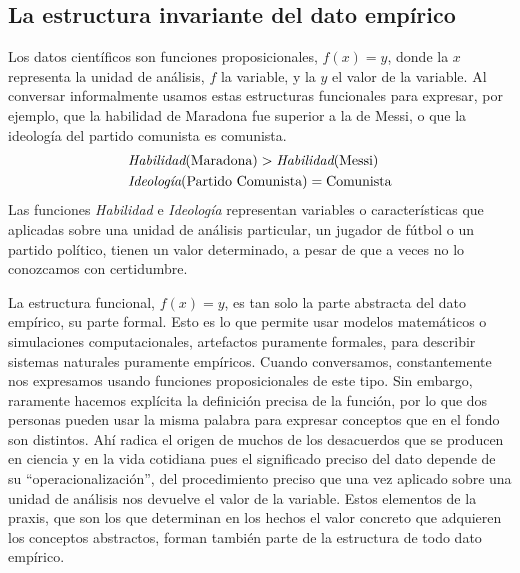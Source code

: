 \documentclass[a4paper,11pt]{book}
\theoremstyle{definition}
\begin{document}



\subsection{La estructura invariante del dato emp\'irico} \label{sec:estructura_invariante}

Los datos cient\'ificos son funciones proposicionales, $f(x)=y$, donde la $x$ representa la unidad de an\'alisis, $f$ la variable, y la $y$ el valor de la variable.
%
%
Al conversar informalmente usamos estas estructuras funcionales para expresar, por ejemplo, que la habilidad de Maradona fue superior a la de Messi, o que la ideolog\'ia del partido comunista es comunista.
%
\begin{align*}\label{eq:opiniones}
& \emph{Habilidad}(\text{Maradona}) > \emph{Habilidad}(\text{Messi}) \\[0.0cm]
& \textit{Ideolog\'ia}(\text{Partido Comunista}) = \text{Comunista}
\end{align*}
%
Las funciones \emph{Habilidad} e \emph{Ideolog\'ia} representan variables o caracter\'isticas que aplicadas sobre una unidad de an\'alisis particular, un jugador de f\'utbol o un partido pol\'itico, tienen un valor determinado, a pesar de que a veces no lo conozcamos con certidumbre.


La estructura funcional, $f(x)=y$, es tan solo la parte abstracta del dato emp\'irico, su parte formal.
%
Esto es lo que permite usar modelos matem\'aticos o simulaciones computacionales, artefactos puramente formales, para describir sistemas naturales puramente emp\'iricos.
%
Cuando conversamos, constantemente nos expresamos usando funciones proposicionales de este tipo.
%
Sin embargo, raramente hacemos expl\'icita la definici\'on precisa de la funci\'on, por lo que dos personas pueden usar la misma palabra para expresar conceptos que en el fondo son distintos.
%
Ah\'i radica el origen de muchos de los desacuerdos que se producen en ciencia y en la vida cotidiana pues el significado preciso del dato depende de su ``operacionalizaci\'on'', del procedimiento preciso que una vez aplicado sobre una unidad de an\'alisis nos devuelve el valor de la variable.
%
Estos elementos de la praxis, que son los que determinan en los hechos el valor concreto que adquieren los conceptos abstractos, forman tambi\'en parte de la estructura de todo dato emp\'irico.
\end{document}
